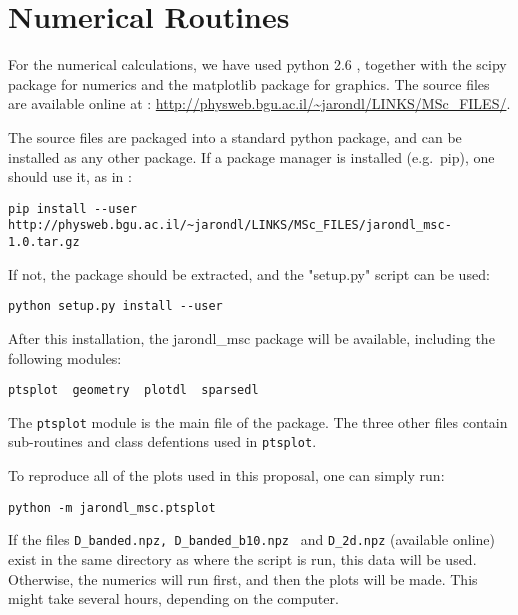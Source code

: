 \chapter{Numerical Routines}

For the numerical calculations, we have used python 2.6 \cite{guido_van_rossum_python_????}, together
with the scipy \cite{jones_scipy:_2001} package for numerics and the matplotlib \cite{hunter_matplotlib:_2007} package
for graphics. The source files are available online at : 
\url{http://physweb.bgu.ac.il/~jarondl/LINKS/MSc_FILES/}.


The source files are packaged into a standard python package,
and can be installed as any other package. If a package manager is installed (e.g.\ pip),
one should use it, as in :
\begin{verbatim}
pip install --user http://physweb.bgu.ac.il/~jarondl/LINKS/MSc_FILES/jarondl_msc-1.0.tar.gz
\end{verbatim}
If not, the package should be extracted, and the "setup.py" script can be used:
\begin{verbatim}
python setup.py install --user
\end{verbatim}
After this installation, the jarondl\_msc package will be available,
including the following modules:
\begin{verbatim}
ptsplot  geometry  plotdl  sparsedl
\end{verbatim}

The \texttt{ptsplot} module is the main file of the package. The three other files contain
sub-routines and class defentions used in \texttt{ptsplot}.


To reproduce all of the plots used in this proposal, one can simply run:
\begin{verbatim}
python -m jarondl_msc.ptsplot
\end{verbatim}
If the files \texttt{D\_banded.npz, D\_banded\_b10.npz } and \texttt{D\_2d.npz} (available online)
exist in the same directory as where the script is run,
this data will be used. Otherwise, the numerics will run first, and then the plots will be made. This might take several hours,
depending on the computer.



